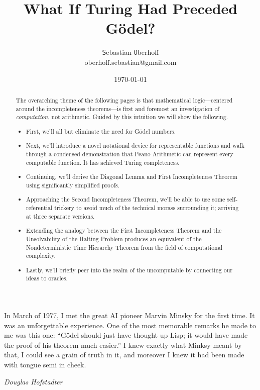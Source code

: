 \documentclass{article}
\theoremstyle{customstyle}
\newcommand{\fm}[1]{\mathsf{#1}}
\begin{document}
\title{\vspace{-1.5cm}What If Turing Had Preceded Gödel?}
\author{$\fm{S}$ebastian $\fm{0}$berhoff\\{\small oberhoff.sebastian@gmail.com}}
\date{\today}

\maketitle

\begin{abstract}
  The overarching theme of the following pages is that mathematical logic---centered around the incompleteness theorems---is first and foremost an investigation of \emph{computation}, not arithmetic. Guided by this intuition we will show the following.
  \begin{itemize}
    \item First, we'll all but eliminate the need for Gödel numbers.
    \item Next, we'll introduce a novel notational device for representable functions and walk through a condensed demonstration that Peano Arithmetic can represent every computable function. It has achieved Turing completeness.
    \item Continuing, we'll derive the Diagonal Lemma and First Incompleteness Theorem using significantly simplified proofs.
    \item Approaching the Second Incompleteness Theorem, we'll be able to use some self-referential trickery to avoid much of the technical morass surrounding it; arriving at three separate versions.
    \item Extending the analogy between the First Incompleteness Theorem and the Unsolvability of the Halting Problem produces an equivalent of the Nondeterministic Time Hierarchy Theorem from the field of computational complexity.
    \item Lastly, we'll briefly peer into the realm of the uncomputable by connecting our ideas to oracles.
  \end{itemize}
\end{abstract}

\epigraph{In March of 1977, I met the great AI pioneer Marvin Minsky for the first time. It was an unforgettable experience. One of the most memorable remarks he made to me was this one: ``Gödel should just have thought up Lisp; it would have made the proof of his theorem much easier.'' I knew exactly what Minksy meant by that, I could see a grain of truth in it, and moreover I knew it had been made with tongue semi in cheek.}{\textit{Douglas Hofstadter}}
\end{document}
